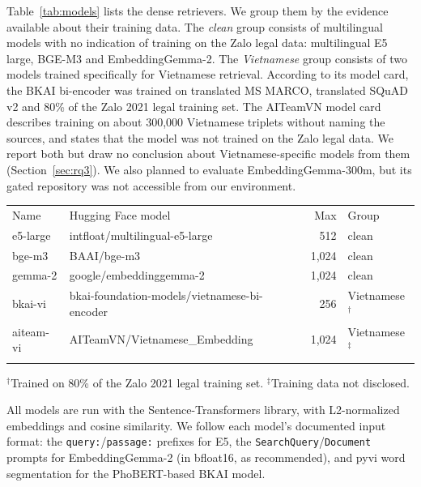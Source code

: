 \documentclass{ws-vjcs}
\begin{document}
Table~\ref{tab:models} lists the dense retrievers. We group them by the evidence available about their training data. The \emph{clean} group consists of multilingual models with no indication of training on the Zalo legal data: multilingual E5 large,\cite{wang2024me5} BGE-M3\cite{chen2024bgem3} and EmbeddingGemma-2.\cite{gemma2emb} The \emph{Vietnamese} group consists of two models trained specifically for Vietnamese retrieval. According to its model card, the BKAI bi-encoder was trained on translated MS MARCO, translated SQuAD v2 and 80\% of the Zalo 2021 legal training set.\cite{bkai2023biencoder} The AITeamVN model card describes training on about 300,000 Vietnamese triplets without naming the sources, and states that the model was not trained on the Zalo legal data.\cite{aiteam2025embedding} We report both but draw no conclusion about Vietnamese-specific models from them (Section~\ref{sec:rq3}). We also planned to evaluate EmbeddingGemma-300m,\cite{vera2025embeddinggemma} but its gated repository was not accessible from our environment.

\begin{table}[t]
{\begin{tabular}{@{}llrl@{}} \toprule
Name & Hugging Face model & Max & Group \\ \colrule
e5-large & intfloat/multilingual-e5-large & 512 & clean \\
bge-m3 & BAAI/bge-m3 & 1,024 & clean \\
gemma-2 & google/embeddinggemma-2 & 1,024 & clean \\
bkai-vi & bkai-foundation-models/vietnamese-bi-encoder & 256 & Vietnamese$^\dagger$ \\
aiteam-vi & AITeamVN/Vietnamese\_Embedding & 1,024 & Vietnamese$^\ddagger$ \\ \botrule
\end{tabular}}
\begin{tabnote}
$^\dagger$Trained on 80\% of the Zalo 2021 legal training set. $^\ddagger$Training data not disclosed.
\end{tabnote}
\end{table}

All models are run with the Sentence-Transformers library,\cite{reimers2019sbert} with L2-normalized embeddings and cosine similarity. We follow each model's documented input format: the \texttt{query:}/\texttt{passage:} prefixes for E5, the \texttt{SearchQuery}/\texttt{Document} prompts for EmbeddingGemma-2 (in bfloat16, as recommended), and pyvi word segmentation for the PhoBERT-based BKAI model.
\end{document}
